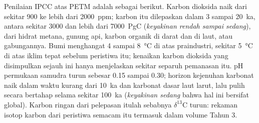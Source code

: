 Penilaian IPCC atas PETM adalah sebagai berikut. Karbon dioksida naik dari sekitar 900 ke lebih dari
\qty{2000}{ppm}; karbon itu dilepaskan dalam 3 sampai \qty{20}{ka}, antara sekitar 3000 dan lebih dari
\qty{7000}{PgC} (\emph{keyakinan rendah sampai sedang}), dari hidrat metana, gunung api, karbon
organik di darat dan di laut, atau gabungannya. Bumi menghangat 4 sampai \qty{8}{\celsius} di atas
praindustri, sekitar \qty{5}{\celsius} di atas iklim tepat sebelum peristiwa itu; kenaikan karbon
dioksida yang disimpulkan sejauh ini hanya menjelaskan sekitar separuh pemanasan itu. pH permukaan samudra turun
sebesar 0.15 sampai 0.30; horizon kejenuhan karbonat naik dalam waktu kurang dari \qty{10}{ka} dan karbonat dasar
laut larut, lalu pulih secara bertahap selama sekitar \qty{100}{ka} (\emph{keyakinan sedang}
bahwa hal ini bersifat global). Karbon ringan dari pelepasan itulah sebabnya $\delta^{13}$C turun: rekaman isotop
karbon dari peristiwa semacam itu termasuk dalam volume Tahun 3.

\begin{omfigure}
\centering
{}
\par{}
\end{omfigure}

